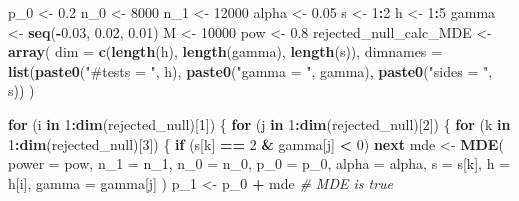 \documentclass[
]{article}
\newenvironment{Shaded}{\begin{snugshade}}{\end{snugshade}}
\newcommand{\CommentTok}[1]{\textcolor[rgb]{0.56,0.35,0.01}{\textit{#1}}}
\newcommand{\ControlFlowTok}[1]{\textcolor[rgb]{0.13,0.29,0.53}{\textbf{#1}}}
\newcommand{\DataTypeTok}[1]{\textcolor[rgb]{0.13,0.29,0.53}{#1}}
\newcommand{\DecValTok}[1]{\textcolor[rgb]{0.00,0.00,0.81}{#1}}
\newcommand{\FloatTok}[1]{\textcolor[rgb]{0.00,0.00,0.81}{#1}}
\newcommand{\KeywordTok}[1]{\textcolor[rgb]{0.13,0.29,0.53}{\textbf{#1}}}
\newcommand{\NormalTok}[1]{#1}
\newcommand{\OperatorTok}[1]{\textcolor[rgb]{0.81,0.36,0.00}{\textbf{#1}}}
\newcommand{\StringTok}[1]{\textcolor[rgb]{0.31,0.60,0.02}{#1}}
\begin{document}
\begin{Shaded}
\begin{Highlighting}[]
{\NormalTok{p_}\DecValTok{0}\NormalTok{ <-}\StringTok{ }\FloatTok{0.2}
\NormalTok{n_}\DecValTok{0}\NormalTok{ <-}\StringTok{ }\DecValTok{8000}
\NormalTok{n_}\DecValTok{1}\NormalTok{ <-}\StringTok{ }\DecValTok{12000}
\NormalTok{alpha <-}\StringTok{ }\FloatTok{0.05}
\NormalTok{s <-}\StringTok{ }\DecValTok{1}\OperatorTok{:}\DecValTok{2}
\NormalTok{h <-}\StringTok{ }\DecValTok{1}\OperatorTok{:}\DecValTok{5}
\NormalTok{gamma <-}\StringTok{ }\KeywordTok{seq}\NormalTok{(}\OperatorTok{-}\FloatTok{0.03}\NormalTok{, }\FloatTok{0.02}\NormalTok{, }\FloatTok{0.01}\NormalTok{)}
\NormalTok{M <-}\StringTok{ }\DecValTok{10000}
\NormalTok{pow <-}\StringTok{ }\FloatTok{0.8}
\NormalTok{rejected_null_calc_MDE <-}\StringTok{ }\KeywordTok{array}\NormalTok{(}
  \DataTypeTok{dim =} \KeywordTok{c}\NormalTok{(}\KeywordTok{length}\NormalTok{(h), }\KeywordTok{length}\NormalTok{(gamma), }\KeywordTok{length}\NormalTok{(s)),}
  \DataTypeTok{dimnames =} \KeywordTok{list}\NormalTok{(}\KeywordTok{paste0}\NormalTok{(}\StringTok{"#tests = "}\NormalTok{, h), }\KeywordTok{paste0}\NormalTok{(}\StringTok{"gamma = "}\NormalTok{, gamma), }\KeywordTok{paste0}\NormalTok{(}\StringTok{"sides = "}\NormalTok{, s))}
\NormalTok{)}

\ControlFlowTok{for}\NormalTok{ (i }\ControlFlowTok{in} \DecValTok{1}\OperatorTok{:}\KeywordTok{dim}\NormalTok{(rejected_null)[}\DecValTok{1}\NormalTok{]) \{}
  \ControlFlowTok{for}\NormalTok{ (j }\ControlFlowTok{in} \DecValTok{1}\OperatorTok{:}\KeywordTok{dim}\NormalTok{(rejected_null)[}\DecValTok{2}\NormalTok{]) \{}
    \ControlFlowTok{for}\NormalTok{ (k }\ControlFlowTok{in} \DecValTok{1}\OperatorTok{:}\KeywordTok{dim}\NormalTok{(rejected_null)[}\DecValTok{3}\NormalTok{]) \{}
      \ControlFlowTok{if}\NormalTok{ (s[k] }\OperatorTok{==}\StringTok{ }\DecValTok{2} \OperatorTok{&}\StringTok{ }\NormalTok{gamma[j] }\OperatorTok{<}\StringTok{ }\DecValTok{0}\NormalTok{) }\ControlFlowTok{next}
\NormalTok{      mde <-}\StringTok{ }\KeywordTok{MDE}\NormalTok{(}
        \DataTypeTok{power =}\NormalTok{ pow, }\DataTypeTok{n_1 =}\NormalTok{ n_}\DecValTok{1}\NormalTok{, }\DataTypeTok{n_0 =}\NormalTok{ n_}\DecValTok{0}\NormalTok{, }\DataTypeTok{p_0 =}\NormalTok{ p_}\DecValTok{0}\NormalTok{, }\DataTypeTok{alpha =}\NormalTok{ alpha,}
        \DataTypeTok{s =}\NormalTok{ s[k], }\DataTypeTok{h =}\NormalTok{ h[i], }\DataTypeTok{gamma =}\NormalTok{ gamma[j]}
\NormalTok{      )}
\NormalTok{      p_}\DecValTok{1}\NormalTok{ <-}\StringTok{ }\NormalTok{p_}\DecValTok{0} \OperatorTok{+}\StringTok{ }\NormalTok{mde }\CommentTok{# MDE is true}

}
\end{Highlighting}
\end{Shaded}
\end{document}
